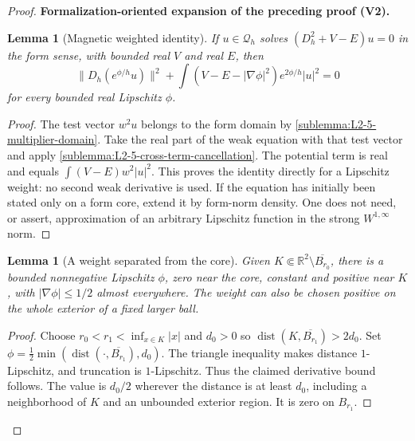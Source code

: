 \documentclass[11pt]{article}
\newtheorem{lemma}[theorem]{Lemma}
\newcommand{\formalisationparentid}{X}
\newenvironment{formalisationaddition}[1]{\par\medskip\begingroup\color{blue}\def\formalisationparentid{#1}\setcounter{formalizationsublemma}{0}\let\lemma\formalizationsublemma\let\endlemma\endformalizationsublemma
  \def\Eo{\mathcal E_h^\circ}\def\EE{\mathcal E_h}\def\phio{\phi_h^\circ}\def\phih{\phi_h}\def\Ho{H_h^{\rm atom}(v^\circ)}\def\Ha{H_h^{\rm atom}}\def\HL{H_h^{L}}\def\Dh{D_h}\def\Log{\operatorname{Log}}\def\ellh{\ell_h}\def\Gp{G_{p,h}}\def\Ast{A_{*,h}}\def\ahat{\widehat{\mathfrak a}_h}\def\ah{\mathfrak a_h}\def\rh{\widehat\rho_h}\def\deltah{\widehat\delta_h}\def\oldref##1{\textup{(##1)}}\def\interface##1{\par\noindent\textit{Analytical interface used here.} ##1\par}\def\finish{\par\noindent\textit{Conclusion of the formalization-oriented expansion.} }\par\noindent\textbf{Formalization-oriented expansion of the preceding proof (V2).}\par\smallskip
}{\par\endgroup\medskip
}
\newcommand{\R}{\mathbb R}
\newcommand{\dist}{\operatorname{dist}}
\begin{document}
\begin{proof}
\begin{formalisationaddition}{L2.5}
\begin{lemma}[Magnetic weighted identity]\label{sublemma:L2-5-agmon-identity}
If $u\in\mathcal Q_h$ solves $(D_h^2+V-E)u=0$ in the form sense, with
bounded real $V$ and real $E$, then
\[
 \|D_h(e^{\phi/h}u)\|^2+
 \int(V-E-|\nabla\phi|^2)e^{2\phi/h}|u|^2=0
\]
for every bounded real Lipschitz $\phi$.
\end{lemma}
\begin{proof}
The test vector $w^2u$ belongs to the form domain by
\ref{sublemma:L2-5-multiplier-domain}. Take the real part of the weak
equation with that test vector and apply
\ref{sublemma:L2-5-cross-term-cancellation}. The potential term is real
and equals $\int(V-E)w^2|u|^2$. This proves the identity directly for a
Lipschitz weight: no second weak derivative is used. If the equation has
initially been stated only on a form core, extend it by form-norm density.
One does not need, or assert, approximation of an arbitrary Lipschitz
function in the strong $W^{1,\infty}$ norm.
\end{proof}

\begin{lemma}[A weight separated from the core]\label{sublemma:L2-5-weight}
Given $K\Subset\R^2\setminus\overline{B_{r_0}}$, there is a bounded
nonnegative Lipschitz $\phi$, zero near the core, constant and positive
near $K$, with $|\nabla\phi|\le1/2$ almost everywhere. The weight can
also be chosen positive on the whole exterior of a fixed larger ball.
\end{lemma}
\begin{proof}
Choose $r_0<r_1<\inf_{x\in K}|x|$ and $d_0>0$ so
$\dist(K,\overline{B_{r_1}})>2d_0$. Set
$\phi=\frac12\min(\dist(\cdot,\overline{B_{r_1}}),d_0)$.
The triangle inequality makes distance $1$-Lipschitz, and truncation is
$1$-Lipschitz. Thus the claimed derivative bound follows. The value is
$d_0/2$ wherever the distance is at least $d_0$, including a neighborhood
of $K$ and an unbounded exterior region. It is zero on $B_{r_1}$.
\end{proof}


\end{formalisationaddition}
\end{proof}
\end{document}
